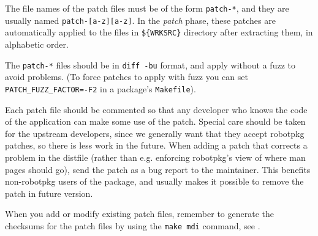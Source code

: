 The file names of the patch files must be of the form {\tt patch-*}, and they
are usually named {\tt patch-[a-z][a-z]}. In  the {\em  patch} phase,  these
patches  are automatically applied  to the  files  in {\tt \$\{WRKSRC\}}
directory after extracting them, in alphabetic order.

The {\tt patch-*} files should be in {\tt diff -bu} format, and apply without a
fuzz to avoid problems.  (To force patches to apply with fuzz  you can set {\tt
PATCH\_FUZZ\_FACTOR=-F2} in a package's {\tt Makefile}).

Each patch file should be commented so that any developer who knows the code of
the application  can make some use of  the patch. Special care  should be taken
for the upstream developers, since  we generally want that they accept robotpkg
patches, so there is less work in the future. When adding a patch that corrects
a problem in the distfile (rather than e.g. enforcing robotpkg's view of where
man pages should go), send the patch as a bug report to the maintainer. This
benefits non-robotpkg users of the package, and usually makes it possible to
remove the patch in future version.

When you add or modify existing patch files, remember to generate the checksums
for the patch files by using the {\tt make mdi} command, see
.
